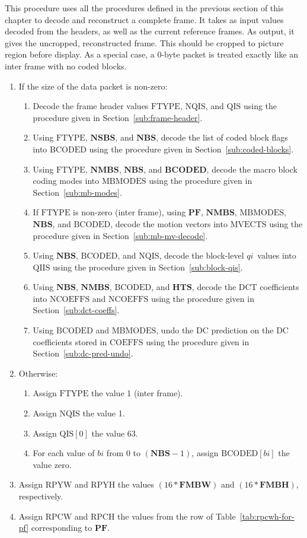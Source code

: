 \documentclass[9pt,letterpaper]{book}
\newcommand{\idx}[1]{{\ensuremath{\mathit{#1}}}}
\newcommand{\qi}{\idx{qi}}
\newcommand{\bi}{\idx{bi}}
\newcommand{\bitvar}[1]{\ensuremath{\mathbf{\bm{#1}}}}
\newcommand{\locvar}[1]{\ensuremath{\mathrm{#1}}}
\numberwithin{equation}{chapter}
\numberwithin{figure}{chapter}
\numberwithin{table}{chapter}
\begin{document}
This procedure uses all the procedures defined in the previous section of this
 chapter to decode and reconstruct a complete frame.
It takes as input values decoded from the headers, as well as the current
 reference frames.
As output, it gives the uncropped, reconstructed frame.
This should be cropped to picture region before display.
As a special case, a 0-byte packet is treated exactly like an inter frame with
 no coded blocks.

\begin{enumerate}
\item
If the size of the data packet is non-zero:
\begin{enumerate}
\item
Decode the frame header values \locvar{FTYPE}, \locvar{NQIS}, and \locvar{QIS}
 using the procedure given in Section~\ref{sub:frame-header}.
\item
Using \locvar{FTYPE}, \bitvar{NSBS}, and \bitvar{NBS}, decode the list of coded
 block flags into \locvar{BCODED} using the procedure given in
 Section~\ref{sub:coded-blocks}.
\item
Using \locvar{FTYPE}, \bitvar{NMBS}, \bitvar{NBS}, and \bitvar{BCODED}, decode
 the macro block coding modes into \locvar{MBMODES} using the procedure given
 in Section~\ref{sub:mb-modes}.
\item
If \locvar{FTYPE} is non-zero (inter frame), using \bitvar{PF}, \bitvar{NMBS},
 \locvar{MBMODES}, \bitvar{NBS}, and \locvar{BCODED}, decode the motion vectors
 into \locvar{MVECTS} using the procedure given in
 Section~\ref{sub:mb-mv-decode}.
\item
Using \bitvar{NBS}, \locvar{BCODED}, and \locvar{NQIS}, decode the block-level
 \qi\ values into \locvar{QIIS} using the procedure given in
 Section~\ref{sub:block-qis}.
\item
Using \bitvar{NBS}, \bitvar{NMBS}, \locvar{BCODED}, and \bitvar{HTS}, decode
 the DCT coefficients into \locvar{NCOEFFS} and \locvar{NCOEFFS} using the
 procedure given in Section~\ref{sub:dct-coeffs}.
\item
Using \locvar{BCODED} and \locvar{MBMODES}, undo the DC prediction on the DC
 coefficients stored in \locvar{COEFFS} using the procedure given in
 Section~\ref{sub:dc-pred-undo}.
\end{enumerate}
\item
Otherwise:
\begin{enumerate}
\item
Assign \locvar{FTYPE} the value 1 (inter frame).
\item
Assign \locvar{NQIS} the value 1.
\item
Assign $\locvar{QIS}[0]$ the value 63.
\item
For each value of \locvar{\bi} from 0 to $(\bitvar{NBS}-1)$, assign
 $\locvar{BCODED}[\locvar{\bi}]$ the value zero.
\end{enumerate}
\item
Assign \locvar{RPYW} and \locvar{RPYH} the values $(16*\bitvar{FMBW})$ and
 $(16*\bitvar{FMBH})$, respectively.
\item
Assign \locvar{RPCW} and \locvar{RPCH} the values from the row of
 Table~\ref{tab:rpcwh-for-pf} corresponding to \bitvar{PF}.


\end{enumerate}
\end{document}
